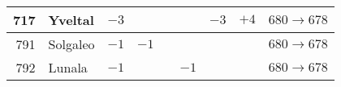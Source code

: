 \documentclass{article}
\begin{document}
\begin{longtable}{rl|cccccc|l}
717 & Yveltal & $-3$ &  &  &  & $-3$ & $+4$ & $680 \rightarrow 678$ \\
\hline %
791 & Solgaleo & $-1$ & $-1$ &  &  &  &  & $680 \rightarrow 678$ \\
792 & Lunala & $-1$ &  &  & $-1$ &  &  & $680 \rightarrow 678$ \\

\end{longtable}
\end{document}
